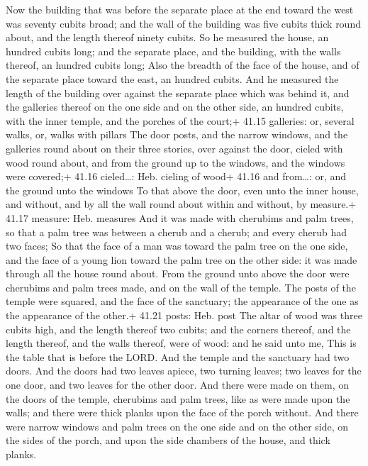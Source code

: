  Now the building that was before the separate place at the
end toward the west was seventy cubits broad; and the wall of the
building was five cubits thick round about, and the length thereof
ninety cubits.  So he measured the house, an hundred cubits
long; and the separate place, and the building, with the walls thereof,
an hundred cubits long;  Also the breadth of the face of
the house, and of the separate place toward the east, an hundred cubits.
 And he measured the length of the building over against
the separate place which was behind it, and the galleries thereof on the
one side and on the other side, an hundred cubits, with the inner
temple, and the porches of the court;+ 41.15 galleries: or, several
walks, or, walks with pillars  The door posts, and the
narrow windows, and the galleries round about on their three stories,
over against the door, cieled with wood round about, and from the ground
up to the windows, and the windows were covered;+ 41.16 cieled\ldots:
Heb. cieling of wood+ 41.16 and from\ldots: or, and the ground unto the
windows  To that above the door, even unto the inner house,
and without, and by all the wall round about within and without, by
measure.+ 41.17 measure: Heb. measures  And it was made
with cherubims and palm trees, so that a palm tree was between a cherub
and a cherub; and every cherub had two faces;  So that the
face of a man was toward the palm tree on the one side, and the face of
a young lion toward the palm tree on the other side: it was made through
all the house round about.  From the ground unto above the
door were cherubims and palm trees made, and on the wall of the temple.
 The posts of the temple were squared, and the face of the
sanctuary; the appearance of the one as the appearance of the other.+
41.21 posts: Heb. post  The altar of wood was three cubits
high, and the length thereof two cubits; and the corners thereof, and
the length thereof, and the walls thereof, were of wood: and he said
unto me, This is the table that is before the LORD.  And
the temple and the sanctuary had two doors.  And the doors
had two leaves apiece, two turning leaves; two leaves for the one door,
and two leaves for the other door.  And there were made on
them, on the doors of the temple, cherubims and palm trees, like as were
made upon the walls; and there were thick planks upon the face of the
porch without.  And there were narrow windows and palm
trees on the one side and on the other side, on the sides of the porch,
and upon the side chambers of the house, and thick planks.

